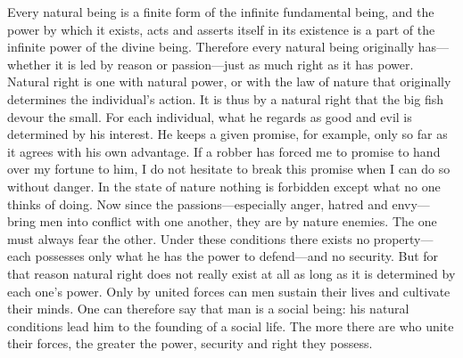 \documentclass[12pt]{book}
\newcommand{\opage}[1]{\marginnote{\footnotesize\textit{[#1]}}}
\begin{document}
Every natural being is a finite form of the infinite fundamental being, and the power by
which it exists, acts and asserts itself in its existence is a part of the infinite power
of the divine being. Therefore every natural being originally has---whether it is led by
reason or passion---just as much right as it has power. Natural right is one with natural
power, or with the law of nature that originally determines the individual's action. It
is thus by a natural right that the big fish devour the small. For each individual, what
\opage{149}he regards as good and evil is determined by his interest. He keeps a given
promise, for example, only so far as it agrees with his own advantage. If a robber has
forced me to promise to hand over my fortune to him, I do not hesitate to break this
promise when I can do so without danger. In the state of nature nothing is forbidden
except what no one thinks of doing. Now since the passions---especially anger, hatred and
envy---bring men into conflict with one another, they are by nature enemies. The one must
always fear the other. Under these conditions there exists no property---each possesses
only what he has the power to defend---and no security. But for that reason natural right
does not really exist at all as long as it is determined by each one's power. Only by
united forces can men sustain their lives and cultivate their minds. One can therefore
say that man is a social being: his natural conditions lead him to the founding of a
social life. The more there are who unite their forces, the greater the power, security
and right they possess.
\end{document}
